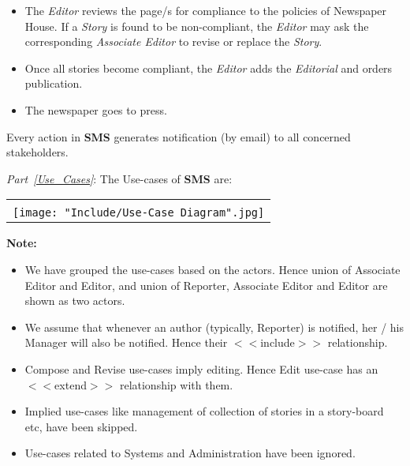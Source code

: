 \documentclass{article}
\begin{document}
\begin{enumerate}
\begin{enumerate}
\begin{itemize}
\item The {\em Editor} reviews the page/s for compliance to the policies of \textsf{Newspaper House}. If a {\em Story} is found to be non-compliant, the {\em Editor} may ask the corresponding {\em Associate Editor} to revise or replace the {\em Story}.

\item Once all stories become compliant, the {\em Editor} adds the {\em Editorial} and orders publication.

\item The newspaper goes to press.
\end{itemize}

Every action in {\bf SMS} generates notification (by email) to all concerned stakeholders. 

\end{enumerate}


\end{enumerate}

\newpage


{\em Part~\ref{Use_Cases}}: The Use-cases of {\bf SMS} are:

\begin{center}
\begin{tabular}{|l|} \hline
\\
\texttt{[image: "Include/Use-Case Diagram".jpg]} \\ \hline
\end{tabular}
\end{center}

{\bf Note:}
\begin{itemize}
\item We have grouped the use-cases based on the actors. Hence union of Associate Editor and Editor, and union of Reporter, Associate Editor and Editor are shown as two actors.
\item We assume that whenever an author (typically, Reporter) is notified, her / his Manager will also be notified. Hence their $<<$include$>>$ relationship.
\item Compose and Revise use-cases imply editing. Hence Edit use-case has an $<<$extend$>>$ relationship with them.
\item Implied use-cases like management of collection of stories in a story-board etc, have been skipped.
\item Use-cases related to Systems and Administration have been ignored.
\end{itemize} 
\end{document}
